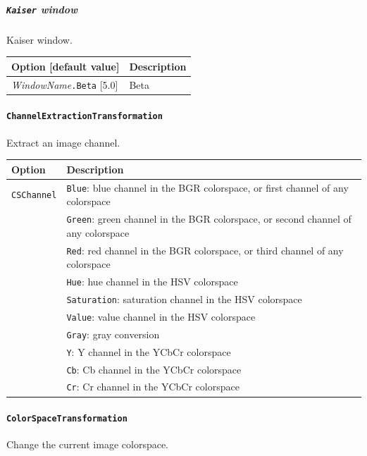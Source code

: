 \documentclass[a4paper,11pt,oneside]{article}
\begin{document}
\subparagraph{\texorpdfstring{%
\lstinline[basicstyle=\ttfamily\bfseries]!Kaiser! window}{Kaiser window}}
Kaiser window.

\begin{center}
 \begin{tabular}{| m{4cm} | m{7cm} | }
 \hline
 Option [default value] & Description\\
 \hline\hline
  \emph{WindowName}\lstinline!.Beta! [5.0] & Beta\\
 \hline
\end{tabular}
\end{center}


\paragraph{\texorpdfstring{%
\lstinline[basicstyle=\ttfamily\bfseries]!ChannelExtractionTransformation!}
{ChannelExtractionTransformation}}
Extract an image channel.

\begin{center}
 \begin{tabular}{| p{5cm} | p{10cm} | }
 \hline
 Option & Description\\
 \hline\hline
  \cellcolor{requiredcolor}\lstinline!CSChannel! & \lstinline!Blue!: blue
  channel in the BGR colorspace, or first channel of any colorspace \\
 & \lstinline!Green!: green channel in the BGR colorspace, or second channel
 of any colorspace \\
 & \lstinline!Red!: red channel in the BGR colorspace, or third channel of any
  colorspace \\
 & \lstinline!Hue!: hue channel in the HSV colorspace \\
 & \lstinline!Saturation!: saturation channel in the HSV colorspace \\
 & \lstinline!Value!: value channel in the HSV colorspace \\
 & \lstinline!Gray!: gray conversion \\
 & \lstinline!Y!: Y channel in the YCbCr colorspace \\
 & \lstinline!Cb!: Cb channel in the YCbCr colorspace \\
 & \lstinline!Cr!: Cr channel in the YCbCr colorspace \\
 \hline
\end{tabular}
\end{center}

\paragraph{\texorpdfstring{%
\lstinline[basicstyle=\ttfamily\bfseries]!ColorSpaceTransformation!}
{ColorSpaceTransformation}}
Change the current image colorspace.
\end{document}
